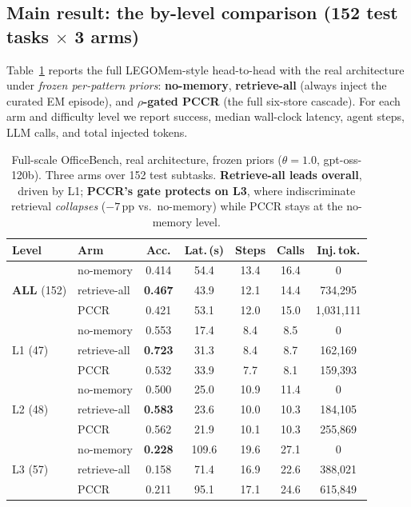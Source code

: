 \documentclass[10pt,twocolumn]{article}
\begin{document}
\subsection{Main result: the by-level comparison (152 test tasks $\times$ 3 arms)}
\label{sec:t1}
Table~\ref{tab:t1main} reports the full LEGOMem-style head-to-head with the real
architecture under \emph{frozen per-pattern priors}: \textbf{no-memory},
\textbf{retrieve-all} (always inject the curated EM episode), and \textbf{$\rho$-gated
PCCR} (the full six-store cascade). For each arm and difficulty level we report success,
median wall-clock latency, agent steps, LLM calls, and total injected tokens.

\begin{table}[t]
\centering\small
\setlength{\tabcolsep}{4.5pt}
\begin{tabular}{@{}llccccc@{}}
\toprule
Level & Arm & Acc. & Lat.\,(s) & Steps & Calls & Inj.\,tok. \\
\midrule
\multirow{3}{*}{\textbf{ALL} (152)}
 & no-memory    & 0.414 & 54.4 & 13.4 & 16.4 & 0 \\
 & retrieve-all & \textbf{0.467} & 43.9 & 12.1 & 14.4 & 734{,}295 \\
 & PCCR         & 0.421 & 53.1 & 12.0 & 15.0 & 1{,}031{,}111 \\
\midrule
\multirow{3}{*}{L1 (47)}
 & no-memory    & 0.553 & 17.4 & 8.4 & 8.5 & 0 \\
 & retrieve-all & \textbf{0.723} & 31.3 & 8.4 & 8.7 & 162{,}169 \\
 & PCCR         & 0.532 & 33.9 & 7.7 & 8.1 & 159{,}393 \\
\midrule
\multirow{3}{*}{L2 (48)}
 & no-memory    & 0.500 & 25.0 & 10.9 & 11.4 & 0 \\
 & retrieve-all & \textbf{0.583} & 23.6 & 10.0 & 10.3 & 184{,}105 \\
 & PCCR         & 0.562 & 21.9 & 10.1 & 10.3 & 255{,}869 \\
\midrule
\multirow{3}{*}{L3 (57)}
 & no-memory    & \textbf{0.228} & 109.6 & 19.6 & 27.1 & 0 \\
 & retrieve-all & 0.158 & 71.4 & 16.9 & 22.6 & 388{,}021 \\
 & PCCR         & 0.211 & 95.1 & 17.1 & 24.6 & 615{,}849 \\
\bottomrule
\end{tabular}
\caption{Full-scale OfficeBench, real architecture, frozen priors ($\theta{=}1.0$,
gpt-oss-120b). Three arms over 152 test subtasks. \textbf{Retrieve-all leads overall},
driven by L1; \textbf{PCCR's gate protects on L3}, where indiscriminate retrieval
\emph{collapses} ($-7$\,pp vs.\ no-memory) while PCCR stays at the no-memory level.}
\label{tab:t1main}
\end{table}
\end{document}
